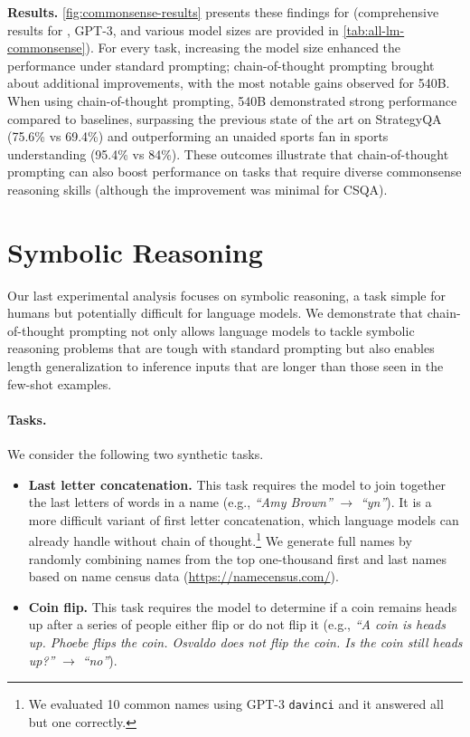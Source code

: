 \textbf{Results.}
\cref{fig:commonsense-results} presents these findings for \palm{} (comprehensive results for \lamda{}, GPT-3, and various model sizes are provided in \cref{tab:all-lm-commonsense}).
For every task, increasing the model size enhanced the performance under standard prompting; chain-of-thought prompting brought about additional improvements, with the most notable gains observed for \palm{} 540B. When using chain-of-thought prompting, \palm{} 540B demonstrated strong performance compared to baselines, surpassing the previous state of the art on StrategyQA (75.6\% vs 69.4\%) and outperforming an unaided sports fan in sports understanding (95.4\% vs 84\%).
These outcomes illustrate that chain-of-thought prompting can also boost performance on tasks that require diverse commonsense reasoning skills (although the improvement was minimal for CSQA).




\section{Symbolic Reasoning}\label{sec:symbolic-reasoning}
Our last experimental analysis focuses on symbolic reasoning, a task simple for humans but potentially difficult for language models. We demonstrate that chain-of-thought prompting not only allows language models to tackle symbolic reasoning problems that are tough with standard prompting but also enables length generalization to inference inputs that are longer than those seen in the few-shot examples.

\paragraph{Tasks.}
We consider the following two synthetic tasks.

\begin{itemize}[leftmargin=*,topsep=0pt]
    \itemsep0em \item \textbf{Last letter concatenation.} This task requires the model to join together the last letters of words in a name (e.g., \textit{``Amy Brown''} $\rightarrow$ \textit{``yn''}). 
    It is a more difficult variant of first letter concatenation, which language models can already handle without chain of thought.\footnote{We evaluated 10 common names using GPT-3 \texttt{davinci} and it answered all but one correctly.} We generate full names by randomly combining names from the top one-thousand first and last names based on name census data ({\small{\url{https://namecensus.com/}}}).
    \item \textbf{Coin flip.} This task requires the model to determine if a coin remains heads up after a series of people either flip or do not flip it (e.g., \textit{``A coin is heads up. Phoebe flips the coin. Osvaldo does not flip the coin. Is the coin still heads up?''} $\rightarrow$ \textit{``no''}).
\end{itemize}

